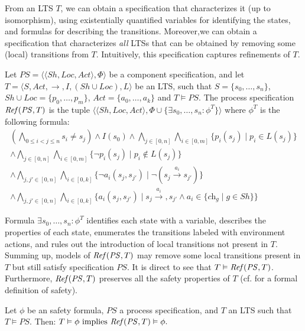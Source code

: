 From an LTS $T$, we can obtain a specification that characterizes it (up to isomorphism), using existentially quantified variables for identifying the states, and formulas for describing the transitions. Moreover,we can obtain a specification that characterizes \emph{all} LTSs that can be obtained by removing some (local) transitions from $T$. Intuitively,  this specification captures refinements of $T$. 
\begin{definition}\label{def:ref-spec} Let $\mathit{PS}= \langle \langle \mathit{Sh},  \mathit{Loc}, \mathit{Act}\rangle, \Phi \rangle$ be a component specification, and let $T=\langle S, \mathit{Act}, \rightarrow, I, (\mathit{Sh} \cup \mathit{Loc}), L\rangle$ be an LTS, such that $S=\{s_0,\dots,s_n\}$, $\mathit{Sh} \cup \mathit{Loc}=\{p_0,\dots,p_m\}$, $\mathit{Act}=\{a_0,\dots,a_k\}$ and $T \vDash \mathit{PS}$. The process specification $\mathit{Ref}(\mathit{PS},T)$ is the tuple $\langle \langle \mathit{Sh}, \mathit{Loc}, \mathit{Act}\rangle, \Phi \cup \{ \exists s_0,\dots,s_n: \phi^T\} \rangle$ where $\phi^T$ is the following formula:
 \[\displaystyle
\begin{array}{l}(\bigwedge_{0\leq i< j \leq n} s_i \neq s_j) \wedge I(s_0) 
															\wedge \bigwedge_{j \in [0,n]} \bigwedge_{i \in [0,m]} \{  p_i(s_j) \mid p_i \in L(s_j) \}  \\
															\wedge  \bigwedge_{j \in [0,n]} \bigwedge_{i \in [0,m]} \{ \neg p_i(s_j) \mid p_i \notin L(s_j) \} \\
															\wedge \bigwedge_{j,j' \in [0,n]} \bigwedge_{i \in [0,k]}  \{ \neg a_i(s_j,s_{j'}) \mid \neg (s_j \xrightarrow{a_i} s_{j'}) \}\\
															\wedge \bigwedge_{j,j'\in [0,n]} \bigwedge_{i \in [0,k]} \{ a_i(s_j,s_{j'}) \mid 
															s_j \xrightarrow{a_i},s_{j'} \wedge a_i \in \{\textit{ch}_g \mid g \in \mathit{Sh} \} \}   
																													
\end{array}				
\]
\end{definition}
Formula $\exists s_0,\dots,s_n: \phi^T$ identifies each state with a variable, describes the properties of each state, enumerates the transitions labeled with environment actions, and rules out the introduction of local transitions not present in $T$. Summing up, models of $\mathit{Ref}(\mathit{PS}, T)$ may remove some local transitions present in $T$ but still satisfy specification $\mathit{PS}$. It is direct to see that $T \vDash \mathit{Ref}(\mathit{PS},T)$. Furthermore, $\mathit{Ref}(\mathit{PS},T)$ preserves all the safety properties of $T$ (cf. \cite{Katoen08} for a formal definition of safety).
\begin{theorem}\label{theorem:preserve-safety} Let $\phi$ be an {\LTL} safety formula, $\mathit{PS}$ a process specification, and $T$ an LTS such that $T \vDash \mathit{PS}$. Then:
$
	T \vDash \phi \text{ implies } \mathit{Ref}(\mathit{PS},T) \vDash \phi. 
$
\end{theorem}

